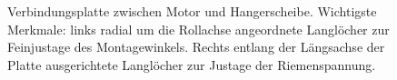 		\begin{figure}[h]
			\centering
			
			\caption[Verbindungsplatte zwischen Motor und Hangerscheibe]{Verbindungsplatte zwischen Motor und Hangerscheibe. Wichtigste Merkmale: links radial um die Rollachse angeordnete Langlöcher zur Feinjustage des Montagewinkels. Rechts entlang der Längsachse der Platte ausgerichtete Langlöcher zur Justage der Riemenspannung.}
			\label{fig:motor piece drawing}
		\end{figure}
